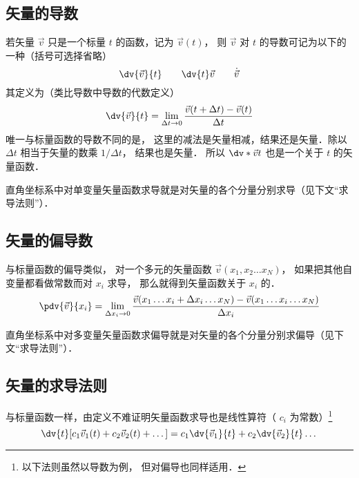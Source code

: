 

\subsection{矢量的导数}

若矢量 $\vec v$ 只是一个标量 $t$ 的函数，记为 $\vec v(t)$， 则 $\vec v$ 对 $t$ 的导数可记为以下的一种（括号可选择省略）
\begin{equation}
\dv{\vec v}{t} \qquad \dv{t}\vec v \qquad \dot{\vec v}
\end{equation}
其定义为（类比导数中导数的代数定义）
\begin{equation}
\dv{\vec v}{t} = \lim_{\Delta t \to 0} \frac{\vec v ( t + \Delta t) - \vec v(t)}{\Delta t}
\end{equation}
唯一与标量函数的导数不同的是， 这里的减法是矢量相减，结果还是矢量．除以 $\Delta t$ 相当于矢量的数乘 $1/\Delta t$， 结果也是矢量． 所以 $\dv*{\vec v}{t}$ 也是一个关于 $t$ 的矢量函数．

直角坐标系中对单变量矢量函数求导就是对矢量的各个分量分别求导（见下文“求导法则”）．

\subsection{矢量的偏导数}
与标量函数的偏导类似， 对一个多元的矢量函数 $\vec v(x_1, x_2\ldots x_N)$， 如果把其他自变量都看做常数而对 $x_i$ 求导， 那么就得到矢量函数关于 $x_i$ 的．
\begin{equation}
\pdv{\vec v}{x_i} = \lim_{\Delta x_i \to 0} \frac{\vec v(x_1 \ldots x_i+\Delta x_i\ldots x_N) -  \vec v(x_1 \ldots x_i\ldots x_N)}{\Delta x_i}
\end{equation}

直角坐标系中对多变量矢量函数求偏导就是对矢量的各个分量分别求偏导（见下文“求导法则”）．

\subsection{矢量的求导法则}
与标量函数一样，由定义不难证明矢量函数求导也是线性算符（ $c_i$ 为常数）\footnote{以下法则虽然以导数为例， 但对偏导也同样适用．}
\begin{equation}
\dv{t}[c_1 \vec v_1(t) + c_2 \vec v_2(t) + \dots] = c_1\dv{\vec v_1}{t} + c_2\dv{\vec v_2}{t} \dots
\end{equation}

